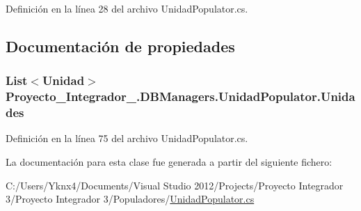 Definición en la línea 28 del archivo Unidad\-Populator.\-cs.



\subsection{Documentación de propiedades}
\hypertarget{class_proyecto___integrador__3_1_1_d_b_managers_1_1_unidad_populator_afe040b3a09b399c74d58c04acbb0d30a}{
\subsubsection[{Unidades}]{\setlength{\rightskip}{0pt plus 5cm}List$<${\bf Unidad}$>$ Proyecto\-\_\-\-Integrador\-\_.\-D\-B\-Managers.\-Unidad\-Populator.\-Unidades\hspace{0.3cm}{\ttfamily [get]}}}\label{class_proyecto___integrador__3_1_1_d_b_managers_1_1_unidad_populator_afe040b3a09b399c74d58c04acbb0d30a}


Definición en la línea 75 del archivo Unidad\-Populator.\-cs.



La documentación para esta clase fue generada a partir del siguiente fichero\-:\begin{DoxyCompactItemize}
\item 
C\-:/\-Users/\-Yknx4/\-Documents/\-Visual Studio 2012/\-Projects/\-Proyecto Integrador 3/\-Proyecto Integrador 3/\-Populadores/\hyperlink{_unidad_populator_8cs}{Unidad\-Populator.\-cs}\end{DoxyCompactItemize}
